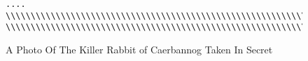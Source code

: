\documentclass{metanorma}
\begin{document}
\begin{figure}[h]\centering
  \label{killer-bunny}
  \caption{A Photo Of The Killer Rabbit of Caerbannog Taken In Secret}
  \begin{verbatim}
....
\\\\\\\\\\\\\\\\\\\\\\\\\\\\\\\\\\\\\\\\\\\\\\\\\\\\\\\\\\\\
\\\\\\\\\\\\\\\\\\\\\\\\\\\\\\\\\\\\\\\\\\\\\\\\\\\\\\\\\\\\

\end{verbatim}
\end{figure}
\end{document}
